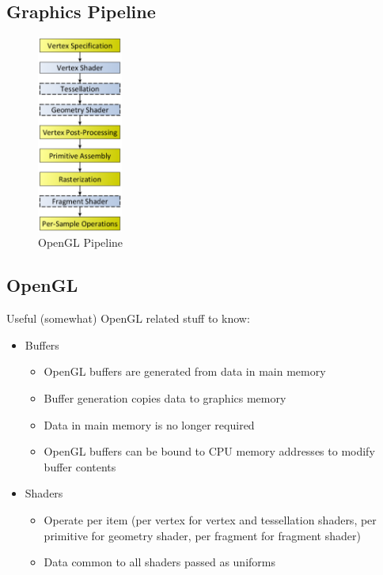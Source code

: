 \documentclass[a4paper]{article}
\begin{document}
\subsection{Graphics Pipeline}

\begin{figure}[h!]
  \centering
  \includegraphics[width=0.25\textwidth]{graphics/rendering_pipeline.eps}
  \caption{OpenGL Pipeline}
  \label{fig:graphics_pipeline}
\end{figure}
\FloatBarrier

\subsection{OpenGL}

Useful (somewhat) OpenGL related stuff to know:

\begin{itemize}
  \item
    Buffers
    \begin{itemize}
      \item
        OpenGL buffers are generated from data in main memory

      \item
        Buffer generation copies data to graphics memory

      \item
        Data in main memory is no longer required

      \item
        OpenGL buffers can be bound to CPU memory addresses to modify buffer
        contents

    \end{itemize}

  \item
    Shaders
    \begin{itemize}
      \item
        Operate per item (per vertex for vertex and tessellation shaders, per
        primitive for geometry shader, per fragment for fragment shader)

      \item
        Data common to all shaders passed as uniforms

    \end{itemize}
\end{itemize}
\end{document}
